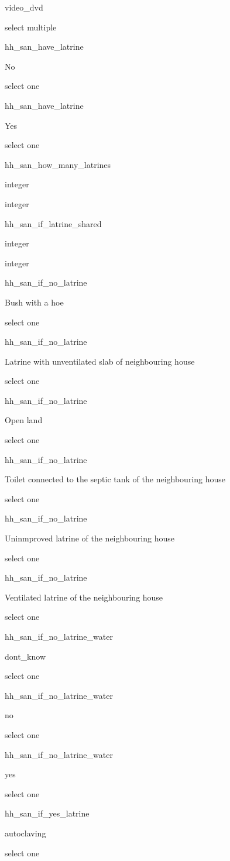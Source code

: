 \documentclass[]{article}
\begin{document}
video\_dvd

select multiple

hh\_san\_have\_latrine

No

select one

hh\_san\_have\_latrine

Yes

select one

hh\_san\_how\_many\_latrines

integer

integer

hh\_san\_if\_latrine\_shared

integer

integer

hh\_san\_if\_no\_latrine

Bush with a hoe

select one

hh\_san\_if\_no\_latrine

Latrine with unventilated slab of neighbouring house

select one

hh\_san\_if\_no\_latrine

Open land

select one

hh\_san\_if\_no\_latrine

Toilet connected to the septic tank of the neighbouring house

select one

hh\_san\_if\_no\_latrine

Uninmproved latrine of the neighbouring house

select one

hh\_san\_if\_no\_latrine

Ventilated latrine of the neighbouring house

select one

hh\_san\_if\_no\_latrine\_water

dont\_know

select one

hh\_san\_if\_no\_latrine\_water

no

select one

hh\_san\_if\_no\_latrine\_water

yes

select one

hh\_san\_if\_yes\_latrine

autoclaving

select one
\end{document}
